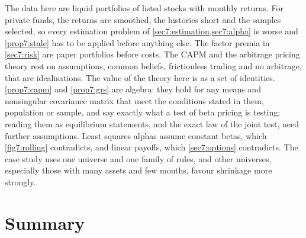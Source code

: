\begin{chapterrefs}
The data here are liquid portfolios of listed stocks with monthly returns. For private funds, the
returns are smoothed, the histories short and the samples selected, so every estimation problem of
\cref{sec7:estimation,sec7:alpha} is worse and \cref{prop7:stale} has to be applied before anything
else. The factor premia in \cref{sec7:risk} are paper portfolios before costs. The CAPM and the
arbitrage pricing theory rest on assumptions, common beliefs, frictionless trading and no arbitrage,
that are idealisations. The value of the theory here is as a set of identities. \cref{prop7:capm} and
\cref{prop7:grs} are algebra: they hold for any means and nonsingular covariance matrix that meet the
conditions stated in them, population or sample, and say exactly what a test of beta pricing is
testing; reading them as equilibrium statements, and the exact law of the joint test,
need further assumptions. Least squares
alphas assume constant betas, which \cref{fig7:rolling} contradicts, and linear payoffs, which
\cref{sec7:options} contradicts. The case study uses one universe and one family of rules, and other
universes, especially those with many assets and few months, favour shrinkage more strongly.

\FloatBarrier
\section{Summary}
\label{sec7:summary}


\end{chapterrefs}
